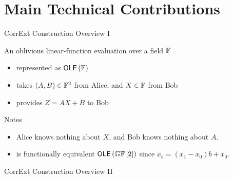 \section{Main Technical Contributions}
\begin{frame}{CorrExt Construction Overview I}
%		
	\begin{definition}
		An oblivious linear-function evaluation over a field $ {\mathbb F} $
		\begin{itemize}
			\item represented as $ \OLE[\bbF] $
			\item takes $ (A,B) \in {\mathbb F}^2 $ from Alice, and $ X \in {\mathbb F} $ from Bob
			\item provides $ Z = AX +B $ to Bob 
		\end{itemize}  
	\end{definition}
	{
	\begin{block}{Notes}
	\begin{itemize}
		\item Alice knows nothing about $ X $, and Bob knows nothing about $ A $.
		\item  \OT is functionally equivalent $ \OLE[\GF{2}] $ since $ x_b = (x_1 - x_0)b + x_0 $.
	\end{itemize}
	\end{block}}
	
\end{frame}

\begin{frame}{CorrExt Construction Overview II}
	
\end{frame}

